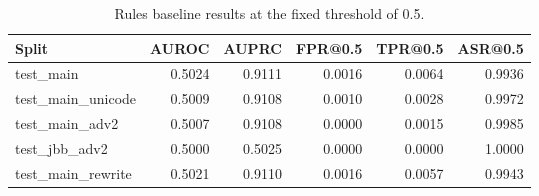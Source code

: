 \begin{table}[t]
\centering
\caption{Rules baseline results at the fixed threshold of 0.5.}
\label{tab:rules_baseline_results}
\small
\begin{tabular}{lrrrrr}
\toprule
Split & AUROC & AUPRC & FPR@0.5 & TPR@0.5 & ASR@0.5 \\
\midrule
test\_main & 0.5024 & 0.9111 & 0.0016 & 0.0064 & 0.9936 \\
test\_main\_unicode & 0.5009 & 0.9108 & 0.0010 & 0.0028 & 0.9972 \\
test\_main\_adv2 & 0.5007 & 0.9108 & 0.0000 & 0.0015 & 0.9985 \\
test\_jbb\_adv2 & 0.5000 & 0.5025 & 0.0000 & 0.0000 & 1.0000 \\
test\_main\_rewrite & 0.5021 & 0.9110 & 0.0016 & 0.0057 & 0.9943 \\
\bottomrule
\end{tabular}
\normalsize
\end{table}